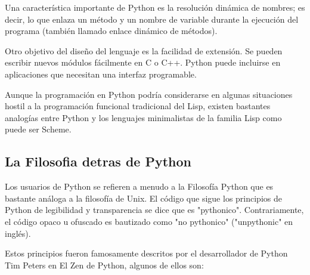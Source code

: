 Una característica importante de Python es la resolución dinámica de nombres;
 es decir, lo que enlaza un método y un nombre de variable durante la ejecución
  del programa (también llamado enlace dinámico de métodos).
  
Otro objetivo del diseño del lenguaje es la facilidad de extensión. Se pueden
escribir nuevos módulos fácilmente en C o C++. Python puede incluirse en
aplicaciones que necesitan una interfaz programable.

Aunque la programación en Python podría considerarse en algunas situaciones
hostil a la programación funcional tradicional del Lisp, existen bastantes
analogías entre Python y los lenguajes minimalistas de la familia Lisp como
puede ser Scheme.

\subsection{La Filosofia detras de Python}
Los usuarios de Python se refieren a menudo a la Filosofía Python que es bastante
análoga a la filosofía de Unix. El código que sigue los principios de Python de
legibilidad y transparencia se dice que es "pythonico". Contrariamente, el
código opaco u ofuscado es bautizado como "no pythonico" ("unpythonic" en inglés).

Estos principios fueron famosamente descritos por el desarrollador de Python Tim
Peters en El Zen de Python, algunos de ellos son:

